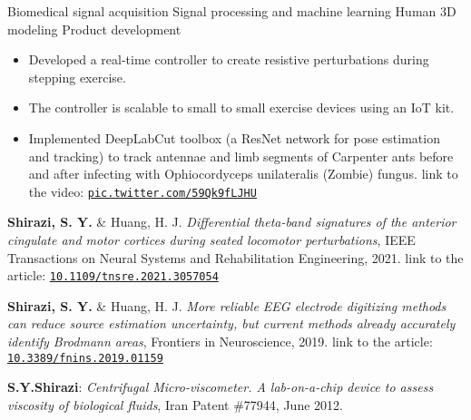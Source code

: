 \begin{outline}
    \1 Biomedical signal acquisition
    \1 Signal processing and machine learning
    \1 Human 3D modeling
    \1 Product development
    
\end{outline}

\begin{itemize}
\item Developed a real-time controller to create resistive perturbations during stepping exercise.
\item The controller is scalable to small to small exercise devices using an IoT kit.
\end{itemize}
\smallskip
{}
\begin{itemize}
\item Implemented DeepLabCut toolbox (a ResNet network for pose estimation and tracking) to track antennae and limb segments of Carpenter ants before and after infecting with Ophiocordyceps unilateralis (Zombie) fungus. {\footnotesize{link to the video:} {\tt{\href{https://pic.twitter.com/59Qk9fLJHU}{pic.twitter.com/59Qk9fLJHU}}}}
\end{itemize}

\smallskip
\textbf{Shirazi, S. Y.} \& Huang, H. J. \textit{Differential theta-band signatures of the anterior cingulate and motor cortices during seated locomotor perturbations}, IEEE Transactions on Neural Systems and Rehabilitation Engineering, 2021. {\footnotesize{link to the article:} {\tt{\href{https://doi.org/10.1109/TNSRE.2021.3057054}{10.1109/tnsre.2021.3057054}}}}
\smallskip
\vspace{1ex}

\textbf{Shirazi, S. Y.} \& Huang, H. J. \textit{More reliable EEG electrode digitizing methods can reduce source estimation uncertainty, but current methods already accurately identify Brodmann areas}, Frontiers in Neuroscience, 2019. {\footnotesize{link to the article:} {\tt{\href{https://www.frontiersin.org/articles/10.3389/fnins.2019.01159/}{10.3389/fnins.2019.01159}}}}

\textbf{S.Y.Shirazi}: \textit{Centrifugal Micro-viscometer. A lab-on-a-chip device to assess viscosity of biological fluids}, Iran Patent \#77944, June 2012.
